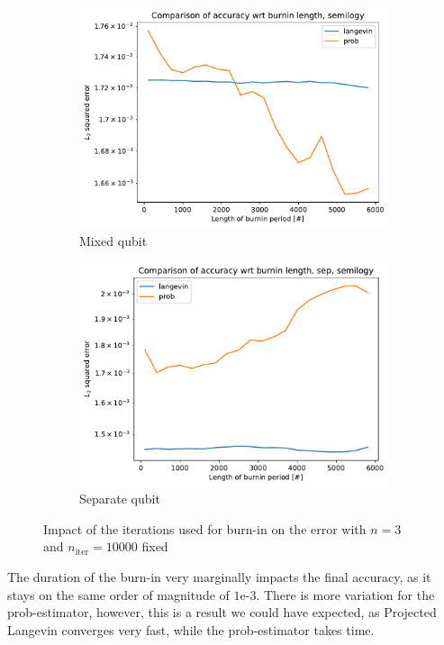 \documentclass[12pt]{memoir}
\newcommand{\nitern}[1]{$n_{\text{iter}}=#1$}
\begin{document}
\begin{figure}[H]
    \centering
    \begin{subfigure}[b]{0.49\textwidth}
        \centering
        \includegraphics[width=\textwidth]{figures/experiments/burnin/burnin_acc_comp_burnin-1.png}
        \caption{Mixed qubit}
        \label{fig:burnin-comp-mixed-DG-sub}
    \end{subfigure}
    \hfill
    \begin{subfigure}[b]{0.49\textwidth}
        \centering
        \includegraphics[width=\textwidth]{figures/experiments/burnin/burnin_acc_comp_burnin_sep-1.png}
        \caption{Separate qubit}
        \label{fig:burnin-comp-sep-DG-sub}
    \end{subfigure}
    \caption{Impact of the iterations used for burn-in on the error with $n=3$ and \nitern{10000} fixed}
    \label{fig:burnin-comp}
\end{figure}
The duration of the burn-in very marginally impacts the final accuracy, as it stays on the same order of magnitude of $1\text{e-}3$. There is more variation for the prob-estimator, however, this is a result we could have expected, as Projected Langevin converges very fast, while the prob-estimator takes time.
\end{document}
